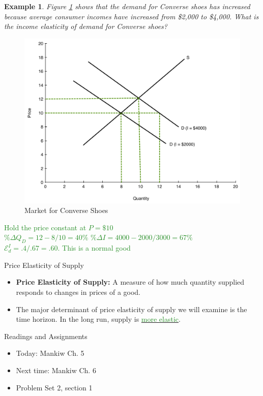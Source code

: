 \documentclass[xcolor={dvipsnames},pdf, hyperref={colorlinks=true, citecolor=ForestGreen, linkcolor=BlueViolet, urlcolor=Magenta}]{beamer}
\newtheorem{exmp}{Example}[section]
\newcommand{\defn}[1]{\textbf{#1}}
\newcommand{\ddp}[1]{{\textcolor{ForestGreen}{#1}}}
\newcommand{\dd}[1]{{\underline{\textcolor{ForestGreen}{#1}}}}
\begin{document}
\begin{frame}[t]
\begin{exmp} 
	\scriptsize
	Figure \ref{fig2} shows that the demand for Converse shoes has increased because average consumer incomes have increased from \$2,000 to \$4,000. What is the income elasticity of demand for Converse shoes?
\end{exmp}


	\begin{figure}[H]
	\centering
	\includegraphics[scale=.25]{hw2_plot1.pdf}
	\caption{Market for Converse Shoes}
	\label{fig2}
\end{figure}

\pause
\ddp{\scriptsize  Hold the price constant at $P=\$10$ 
	\\ $\% \Delta Q_D = 12-8/10 = 40\%$ $\% \Delta I = 4000-2000/3000 = 67\%$ \\ $\mathcal{E}_d^I = .4/.67 = .60.$ This is a normal good}
\end{frame}

\begin{frame}{Price Elasticity of Supply}
	\begin{itemize}
		\item 	\defn{Price Elasticity of Supply:} A measure of how much quantity supplied responds to changes in prices of a good.
		
		
		\item The major determinant of price elasticity of supply we will examine is the time horizon. In the long run, supply is \dd{more elastic}.

	\end{itemize}
\end{frame}

\begin{frame}{Readings and Assignments}
\begin{itemize}
	\item Today: Mankiw Ch. 5
	\item Next time: Mankiw Ch. 6
	\item Problem Set 2, section 1
\end{itemize}
\end{frame}
\end{document}
